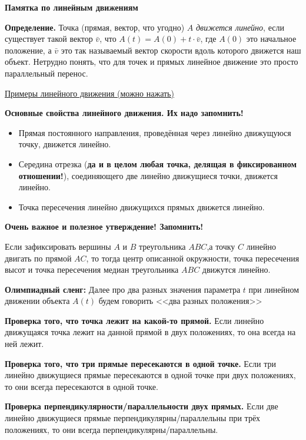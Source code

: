 \centerline{\bf \Huge Памятка по линейным движениям}

\textbf{Определение.}
Точка (прямая, вектор, что угодно) $A$ \textit{движется линейно}, если существует такой вектор $\bar{v}$, что $A(t)=A(0)+t \cdot \bar{v}$, где $A(0)$ это начальное положение, а $\bar{v}$ это так называемый вектор скорости вдоль которого движется наш объект. Нетрудно понять, что для точек и прямых линейное движение это просто параллельный перенос.

\href{https://www.geogebra.org/calculator/aqc37grt}{Примеры линейного движения (можно нажать)}


\textbf{Основные свойства линейного движения. Их надо запомнить!}

\begin{itemize}
    \item[1)] Прямая постоянного направления, проведённая через линейно движущуюся точку, движется линейно.
    \item[2)] Середина отрезка (\textbf{да и в целом любая точка, делящая в фиксированном отношении!}), соединяющего две линейно движущиеся точки, движется линейно.
    \item[3)] Точка пересечения линейно движущихся прямых движется линейно.
\end{itemize}

\textbf{Очень важное и полезное утверждение! Запомнить!}

Если зафиксировать вершины $A$ и $B$ треугольника $ABC$,а точку $C$ линейно двигать по прямой $AC$, то тогда центр описанной окружности, точка пересечения высот и точка пересечения медиан треугольника $A B C$ движутся линейно.

\textbf{Олимпиадный сленг: }Далее про два разных значения параметра $t$ при линейном движении объекта $A(t)$ будем говорить <<два разных положения>>

\textbf{Проверка того, что точка лежит на какой-то прямой.} Если линейно движущаяся точка лежит на данной прямой в двух положениях, то она всегда на ней лежит.

\textbf{Проверка того, что три прямые пересекаются в одной точке.}
Если три линейно движущиеся прямые пересекаются в одной точке при двух положениях, то они всегда пересекаются в одной точке.

\textbf{Проверка перпендикулярности/параллельности двух прямых.} Если две линейно движущиеся прямые перпендикулярны/параллельны при трёх положениях, то они всегда перпендикулярны/параллельны.

